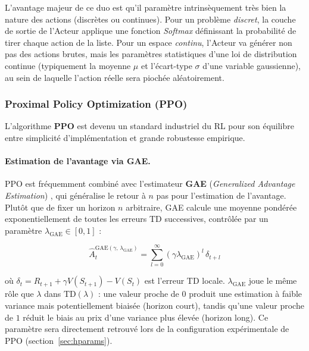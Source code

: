 L'avantage majeur de ce duo est qu'il paramètre intrinsèquement très bien la nature des actions (discrètes ou continues). Pour un problème \textit{discret}, la couche de sortie de l'Acteur applique une fonction \textit{Softmax} définissant la probabilité de tirer chaque action de la liste. Pour un espace \textit{continu}, l'Acteur va générer non pas des actions brutes, mais les paramètres statistiques d'une loi de distribution continue (typiquement la moyenne $\mu$ et l'écart-type $\sigma$ d'une variable gaussienne), au sein de laquelle l'action réelle sera piochée aléatoirement.

\subsubsection{Proximal Policy Optimization (PPO)}
\label{sec:ppo}
 
L'algorithme \textbf{PPO} \parencite{schulmanProximalPolicyOptimization2017}
est devenu un standard industriel du RL pour son équilibre entre simplicité
d'implémentation et grande robustesse empirique.
 
\paragraph{Estimation de l'avantage via GAE.}
PPO est fréquemment combiné avec l'estimateur \textbf{GAE}
(\textit{Generalized Advantage Estimation})
\parencite{schulmanHighDimensionalContinuousControl2018}, qui généralise
le retour à $n$ pas pour l'estimation de l'avantage. Plutôt que de fixer
un horizon $n$ arbitraire, GAE calcule une moyenne pondérée exponentiellement
de toutes les erreurs TD successives, contrôlée par un paramètre
$\lambda_{\text{GAE}} \in [0,1]$ :
 
\begin{equation}
    \hat{A}_t^{\text{GAE}(\gamma,\,\lambda_{\text{GAE}})}
    = \sum_{l=0}^{\infty} (\gamma\lambda_{\text{GAE}})^l\,\delta_{t+l}
\end{equation}
 
\noindent où $\delta_t = R_{t+1} + \gamma V(S_{t+1}) - V(S_t)$ est l'erreur
TD locale. $\lambda_{\text{GAE}}$ joue le même rôle que $\lambda$ dans
$\text{TD}(\lambda)$ : une valeur proche de $0$ produit une estimation à
faible variance mais potentiellement biaisée (horizon court), tandis qu'une
valeur proche de $1$ réduit le biais au prix d'une variance plus élevée
(horizon long). Ce paramètre sera directement retrouvé lors de la
configuration expérimentale de PPO (section~\ref{sec:hparams}).
 
